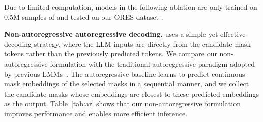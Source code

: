 {
\setlength{\tabcolsep}{2pt}
\begin{table}[ht]
    \centering
    \vspace{-2mm}
    \caption{\textbf{Analysis of candidate mask quality.} ``Oracle'' denotes a setting where the ground-truth targets are known and the closest candidates are chosen. Compared with previous models, the best candidates proposed by the segmentation models in \ourmodel already obtain much higher mask quality, even without finetuning on RES tasks. Building upon the high-quality candidates, \ourmodel delivers the strongest final performance. }
    \label{tab:oracle}
    \vspace{-2mm}
\end{table}
}

Due to limited computation, models in the following ablation are only trained on 0.5M samples of \ourlargedata and tested on our ORES dataset \ourgooddata.

\noindent\textbf{Non-autoregressive \vs autoregressive decoding.} \ourmodel uses a simple yet effective decoding strategy, where the LLM inputs are directly from the candidate mask tokens rather than the previously predicted tokens. We compare our non-autoregressive formulation with the traditional autoregressive paradigm adopted by previous LMMs~\cite{lai2024lisa, xia2024gsva, zhang2024groundhog}. The autoregressive baseline learns to predict continuous mask embeddings of the selected masks in a sequential manner, and we collect the candidate masks whose embeddings are closest to these predicted embeddings as the output. Table~\ref{tab:ar} shows that our non-autoregressive formulation improves performance and enables more efficient inference.

